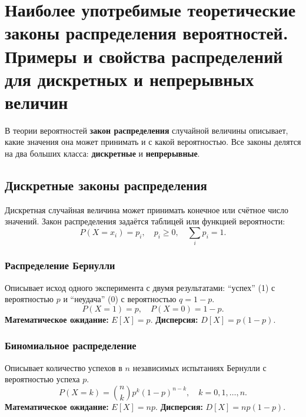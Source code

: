 \section{Наиболее употребимые теоретические законы распределения вероятностей. Примеры и свойства распределений для дискретных и непрерывных величин}

В теории вероятностей \textbf{закон распределения} случайной величины описывает, какие значения она может принимать и с какой вероятностью.  
Все законы делятся на два больших класса: \textbf{дискретные} и \textbf{непрерывные}.

\subsection{Дискретные законы распределения}

Дискретная случайная величина может принимать конечное или счётное число значений. Закон распределения задаётся таблицей или функцией вероятности:
\[
P(X = x_i) = p_i, \quad p_i \geq 0, \quad \sum_{i} p_i = 1.
\]

\subsubsection{Распределение Бернулли}
Описывает исход одного эксперимента с двумя результатами: ``успех'' (1) с вероятностью $p$ и ``неудача'' (0) с вероятностью $q = 1 - p$.
\[
P(X = 1) = p, \quad P(X = 0) = 1 - p.
\]
\textbf{Математическое ожидание:} $E[X] = p$.  
\textbf{Дисперсия:} $D[X] = p(1-p)$.

\begin{center}
\end{center}

\subsubsection{Биномиальное распределение}
Описывает количество успехов в $n$ независимых испытаниях Бернулли с вероятностью успеха $p$.
\[
P(X = k) = \binom{n}{k} p^k (1-p)^{n-k}, \quad k = 0,1,\dots,n.
\]
\textbf{Математическое ожидание:} $E[X] = np$.  
\textbf{Дисперсия:} $D[X] = np(1-p)$.

